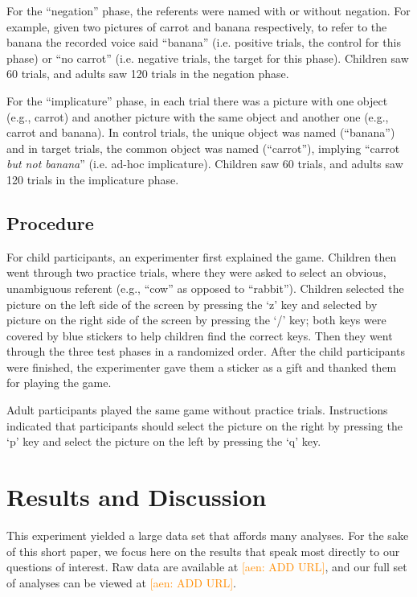 \documentclass[10pt,letterpaper]{article}
\newcommand{\aen}[1]{\textcolor{DarkOrange}{[aen: #1]}}
\begin{document}
For the ``negation'' phase, the referents were named with or without negation. For example, given two pictures of carrot and banana respectively, to refer to the banana the recorded voice said ``banana'' (i.e. positive trials, the control for this phase) or ``no carrot'' (i.e. negative trials, the target for this phase). Children saw 60 trials, and adults saw 120 trials in the negation phase. 

For the ``implicature'' phase, in each trial there was a picture with one object (e.g., carrot) and another picture with the same object and another one (e.g., carrot and banana). In control trials, the unique object was named (``banana'') and in target trials, the common object was named (``carrot''), implying ``carrot \emph{but not banana}'' (i.e. ad-hoc implicature). Children saw 60 trials, and adults saw 120 trials in the implicature phase.  

\subsection{Procedure}

For child participants, an experimenter first explained the game.  Children then went through two practice trials, where they were asked to select an obvious, unambiguous referent (e.g., ``cow'' as opposed to ``rabbit'').  Children selected the picture on the left side of the screen by pressing the `z' key and selected by picture on the right side of the screen by pressing the `/' key; both keys were covered by blue stickers to help children find the correct keys. Then they went through the three test phases in a randomized order.  After the child participants were finished, the experimenter gave them a sticker as a gift and thanked them for playing the game.

Adult participants played the same game without practice trials.  Instructions indicated that participants should select the picture on the right by pressing the `p' key and select the picture on the left by pressing the `q' key.  

\section{Results and Discussion}

This experiment yielded a large data set that affords many analyses.  For the sake of this short paper, we focus here on the results that speak most directly to our questions of interest.  Raw data are available at \aen{ADD URL}, and our full set of analyses can be viewed at \aen{ADD URL}.  
\end{document}
